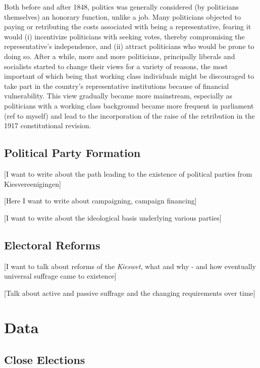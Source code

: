 \documentclass[12pt]{article}
\begin{document}
    
    
    Both before and after 1848, politics was generally considered (by politicians themselves) an honorary function, unlike a job. Many politicians objected to paying or retributing the costs associated with being a representative, fearing it would (i) incentivize politicians with seeking votes, thereby compromising the representative's independence, and (ii) attract politicians who would be prone to doing so. After a while, more and more politicians, principally liberals and socialists started to change their views for a variety of reasons, the most important of which being that working class individuals might be discouraged to take part in the country's representative institutions because of financial vulnerability. This view gradually became more mainstream, especially as politicians with a working class background became more frequent in parliament (ref to myself) and lead to the incorporation of the raise of the retribution in the 1917 constitutional revision. 
    
    
\subsection{Political Party Formation}

    [I want to write about the path leading to the existence of political parties from Kiesvereenigingen]

    [Here I want to write about campaigning, campaign financing]

    [I want to write about the ideological basis underlying various parties]

\subsection{Electoral Reforms}

    [I want to talk about reforms of the \textit{Kieswet}, what and why - and how eventually universal suffrage came to existence]

    [Talk about active and passive suffrage and the changing requirements over time]


\section{Data}
\subsection{Close Elections}
\end{document}
